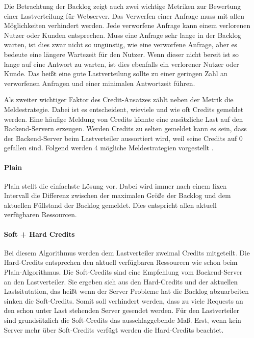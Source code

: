 \documentclass[a4paper, 12pt, BCOR10mm, DIV12, toc=bibliography, toc=listof, german]{scrbook}
\begin{document}
	Die Betrachtung der Backlog zeigt auch zwei wichtige Metriken zur Bewertung einer Lastverteilung
	für Webserver. Das Verwerfen einer Anfrage muss mit allen Möglichkeiten verhindert werden. Jede
	verworfene Anfrage kann einem verlorenen Nutzer oder Kunden entsprechen. Muss eine Anfrage sehr
	lange in der Backlog warten, ist dies zwar nicht so ungünstig, wie eine verworfene Anfrage, aber
	es bedeute eine längere Wartezeit für den Nutzer. Wenn dieser nicht bereit ist so lange auf eine
	Antwort zu warten, ist dies ebenfalls ein verlorener Nutzer oder Kunde. Das heißt eine gute
	Lastverteilung sollte zu einer geringen Zahl an verworfenen Anfragen und einer minimalen
	Antwortzeit führen.

	Als zweiter wichtiger Faktor des Credit-Ansatzes zählt neben der Metrik die Meldestrategie. Dabei
	ist es entscheident, wieviele und wie oft Credits gemeldet werden. Eine häufige Meldung von Credits
	könnte eine zusätzliche Last auf den Backend-Servern erzeugen. Werden Credits zu selten gemeldet
	kann es sein, dass der Backend-Server beim Lastverteiler aussortiert wird, weil seine Credits auf
	0 gefallen sind. Folgend werden 4 mögliche Meldestrategien vorgestellt \cite{scsczile2008,
	schneidenbach2009}.

	\paragraph{Plain} %
	\label{par:plain}

		Plain stellt die einfachste Lösung vor. Dabei wird immer nach einem fixen Intervall die
		Differenz zwischen der maximalen Größe der Backlog und dem aktuellen Füllstand der Backlog
		gemeldet. Dies entspricht allen aktuell verfügbaren Ressourcen.


	\paragraph{Soft + Hard Credits} %
	\label{par:soft-hard-credits}

	Bei diesem Algorithmus werden dem Lastverteiler zweimal Credits mitgeteilt. Die Hard-Credits
	entsprechen den aktuell verfügbaren Ressourcen wie schon beim Plain-Algorithmus. Die Soft-Credits
	sind eine Empfehlung vom Backend-Server an den Lastverteiler. Sie ergeben sich aus den
	Hard-Credits und der aktuellen Lastsitutation, das heißt wenn der Server Probleme hat die Backlog
	abzuarbeiten sinken die Soft-Credits. Somit soll verhindert werden, dass zu viele Requests an den
	schon unter Last stehenden Server gesendet werden. Für den Lastverteiler sind grundsätzlich die
	Soft-Credits das ausschlaggebende Maß. Erst, wenn kein Server mehr über Soft-Credits verfügt
	werden die Hard-Credits beachtet.
\end{document}
